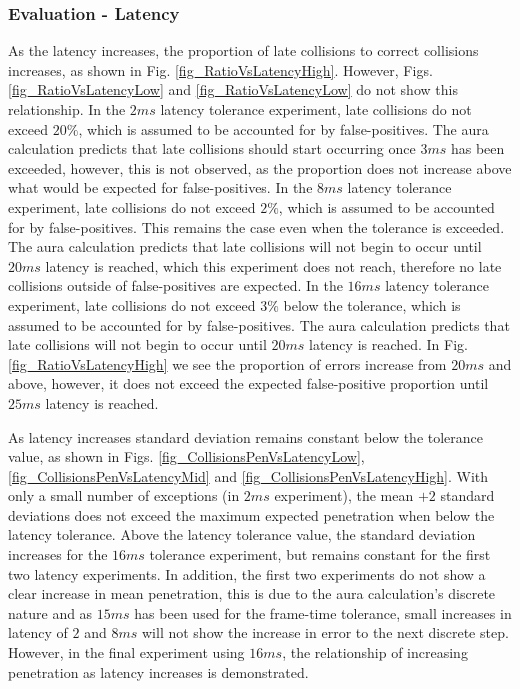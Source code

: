 \subsubsection{Evaluation - Latency}
As the latency increases, the proportion of late collisions to correct collisions increases, as shown in Fig. \ref{fig_RatioVsLatencyHigh}. However, Figs. \ref{fig_RatioVsLatencyLow} and \ref{fig_RatioVsLatencyLow} do not show this relationship. In the $2ms$ latency tolerance experiment, late collisions do not exceed $20\%$, which is assumed to be accounted for by false-positives. The aura calculation predicts that late collisions should start occurring once $3ms$ has been exceeded, however, this is not observed, as the proportion does not increase above what would be expected for false-positives.
In the $8ms$ latency tolerance experiment, late collisions do not exceed $2\%$, which is assumed to be accounted for by false-positives. This remains the case even when the tolerance is exceeded. The aura calculation predicts that late collisions will not begin to occur until $20ms$ latency is reached, which this experiment does not reach, therefore no late collisions outside of false-positives are expected. In the $16ms$ latency tolerance experiment, late collisions do not exceed $3\%$ below the tolerance, which is assumed to be accounted for by false-positives. The aura calculation predicts that late collisions will not begin to occur until $20ms$ latency is reached. In Fig. \ref{fig_RatioVsLatencyHigh} we see the proportion of errors increase from $20ms$ and above, however, it does not exceed the expected false-positive proportion until $25ms$ latency is reached.


As latency increases standard deviation remains constant below the tolerance value, as shown in Figs. \ref{fig_CollisionsPenVsLatencyLow}, \ref{fig_CollisionsPenVsLatencyMid} and \ref{fig_CollisionsPenVsLatencyHigh}. With only a small number of exceptions (in $2ms$ experiment), the mean $+2$ standard deviations does not exceed the maximum expected penetration when below the latency tolerance. Above the latency tolerance value, the standard deviation increases for the $16ms$ tolerance experiment, but remains constant for the first two latency experiments. In addition, the first two experiments do not show a clear increase in mean penetration, this is due to the aura calculation's discrete nature and as $15ms$ has been used for the frame-time tolerance, small increases in latency of $2$ and $8ms$ will not show the increase in error to the next discrete step. However, in the final experiment using $16ms$, the relationship of increasing penetration as latency increases is demonstrated.

